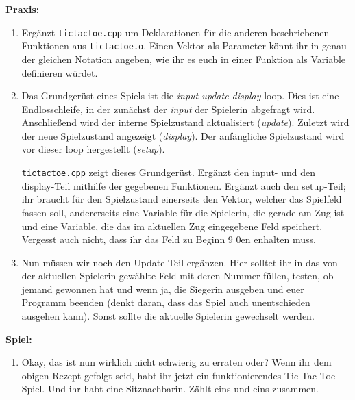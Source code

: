 \textbf{Praxis:}
\begin{enumerate}
	\item
		Ergänzt \texttt{tictactoe.cpp} um Deklarationen für die anderen beschriebenen Funktionen aus \texttt{tictactoe.o}.
		Einen Vektor als Parameter könnt ihr in genau der gleichen Notation angeben, wie ihr es euch in einer Funktion als Variable definieren würdet.
	\item
		Das Grundgerüst eines Spiels ist die \emph{input-update-display}-loop.
    Dies ist eine Endlosschleife, in der zunächst der \emph{input} der Spielerin abgefragt wird.
		Anschließend wird der interne Spielzustand aktualisiert (\emph{update}).
		Zuletzt wird der neue Spielzustand angezeigt (\emph{display}).
		Der anfängliche Spielzustand wird vor dieser loop hergestellt (\emph{setup}).

		\texttt{tictactoe.cpp} zeigt dieses Grundgerüst.
		Ergänzt den input- und den display-Teil mithilfe der gegebenen Funktionen.
		Ergänzt auch den setup-Teil; ihr braucht für den Spielzustand einerseits den Vektor, welcher das Spielfeld fassen soll, andererseits eine Variable für die Spielerin, die gerade am Zug ist und eine Variable, die das im aktuellen Zug eingegebene Feld speichert.
		Vergesst auch nicht, dass ihr das Feld zu Beginn 9 0en enhalten muss.
	\item
		Nun müssen wir noch den Update-Teil ergänzen.
		Hier solltet ihr in das von der aktuellen Spielerin gewählte Feld mit deren Nummer füllen, testen, ob jemand gewonnen hat und wenn ja, die Siegerin ausgeben und euer Programm beenden (denkt daran, dass das Spiel auch unentschieden ausgehen kann).
		Sonst sollte die aktuelle Spielerin gewechselt werden.
\end{enumerate}

\textbf{Spiel:}
\begin{enumerate}
	\item
		Okay, das ist nun wirklich nicht schwierig zu erraten oder?
		Wenn ihr dem obigen Rezept gefolgt seid, habt ihr jetzt ein funktionierendes Tic-Tac-Toe Spiel.
		Und ihr habt eine Sitznachbarin.
		Zählt eins und eins zusammen.
\end{enumerate}
